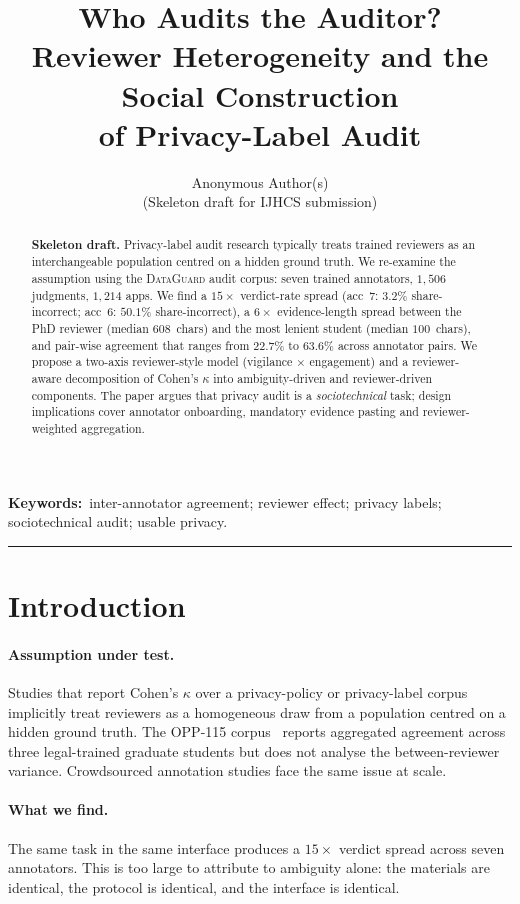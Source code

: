 \documentclass[11pt,a4paper]{article}
\title{\bfseries Who Audits the Auditor? \\
Reviewer Heterogeneity and the Social Construction \\
of Privacy-Label Audit}
\author{Anonymous Author(s)\\\small (Skeleton draft for IJHCS submission)}
\date{}
\newcommand{\dataguard}{\textsc{DataGuard}}
\begin{document}
\maketitle

\begin{abstract}
\noindent\textbf{Skeleton draft.}
Privacy-label audit research typically treats trained reviewers as an
interchangeable population centred on a hidden ground truth. We
re-examine the assumption using the \dataguard{} audit corpus: seven
trained annotators, $1{,}506$ judgments, $1{,}214$ apps. We find a
$15{\times}$ verdict-rate spread (acc~7: $3.2\%$ share-incorrect; acc~6:
$50.1\%$ share-incorrect), a $6{\times}$ evidence-length spread between
the PhD reviewer (median $608$~chars) and the most lenient student
(median $100$~chars), and pair-wise agreement that ranges from $22.7\%$
to $63.6\%$ across annotator pairs. We propose a two-axis reviewer-style
model (vigilance $\times$ engagement) and a reviewer-aware decomposition
of Cohen's $\kappa$ into ambiguity-driven and reviewer-driven
components. The paper argues that privacy audit is a \emph{sociotechnical}
task; design implications cover annotator onboarding, mandatory
evidence pasting and reviewer-weighted aggregation.
\end{abstract}

\noindent\textbf{Keywords:}\ inter-annotator agreement; reviewer effect;
privacy labels; sociotechnical audit; usable privacy.

\bigskip\hrule\bigskip

\section{Introduction}
\paragraph{Assumption under test.}
Studies that report Cohen's $\kappa$ over a privacy-policy or
privacy-label corpus implicitly treat reviewers as a homogeneous draw
from a population centred on a hidden ground truth. The OPP-115
corpus~\citep{wilson2016creation} reports aggregated agreement across
three legal-trained graduate students but does not analyse the
between-reviewer variance. Crowdsourced annotation studies face the
same issue at scale.

\paragraph{What we find.}
The same task in the same interface produces a $15{\times}$ verdict
spread across seven annotators. This is too large to attribute to
ambiguity alone: the materials are identical, the protocol is identical,
and the interface is identical.
\end{document}
